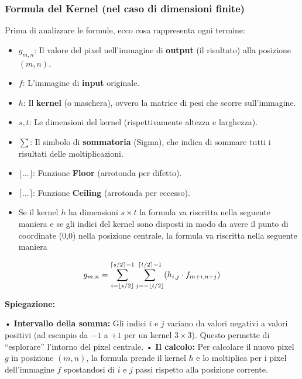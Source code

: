 \documentclass[
]{article}
\begin{document}
\hypertarget{formula-del-kernel-nel-caso-di-dimensioni-finite}{%
\subsubsection{Formula del Kernel (nel caso di dimensioni finite)}\label{formula-del-kernel-nel-caso-di-dimensioni-finite}}

Prima di analizzare le formule, ecco cosa rappresenta ogni termine:

\begin{itemize}
\item
  \textbf{\(g_{m,n}\)}: Il valore del pixel nell'immagine di \textbf{output} (il risultato) alla posizione \((m, n)\).
\item
  \textbf{\(f\)}: L'immagine di \textbf{input} originale.
\item
  \textbf{\(h\)}: Il \textbf{kernel} (o maschera), ovvero la matrice di pesi che scorre sull'immagine.
\item
  \(s,t\): Le dimensioni del kernel (rispettivamente altezza e larghezza).
\item
  \textbf{\(\sum\)}: Il simbolo di \textbf{sommatoria} (Sigma), che indica di sommare tutti i risultati delle moltiplicazioni.
\item
  \textbf{\(\lfloor \dots \rfloor\)}: Funzione \textbf{Floor} (arrotonda per difetto).
\item
  \textbf{\(\lceil \dots \rceil\)}: Funzione \textbf{Ceiling} (arrotonda per eccesso).
\item
  Se il kernel \(h\) ha dimensioni \(s \times t\) la formula va riscritta nella seguente maniera e se gli indici del kernel sono disposti in modo da avere il punto di coordinate (0,0) nella posizione centrale, la
  formula va riscritta nella seguente maniera
\end{itemize}

\[
g_{m,n} = \sum_{i = \left\lfloor s/2 \right\rfloor}^{\left\lceil s/2 \right\rceil-1} \sum_{j = -\left\lfloor t/2 \right\rfloor }^{\left\lceil t/2 \right\rceil -1} (h_{i,j} \space \cdot \space f_{m+i,n + j})
\]

\textbf{Spiegazione:}

• \textbf{Intervallo della somma:} Gli indici \(i\) e \(j\) variano da valori negativi a valori positivi (ad esempio da \(-1\) a \(+1\) per un kernel \(3 \times 3\)). Questo permette di ``esplorare'' l'intorno del pixel centrale.
• \textbf{Il calcolo:} Per calcolare il nuovo pixel \(g\) in posizione \((m, n)\), la formula prende il kernel \(h\) e lo moltiplica per i pixel dell'immagine \(f\) spostandosi di \(i\) e \(j\) passi rispetto alla posizione corrente.
\end{document}
